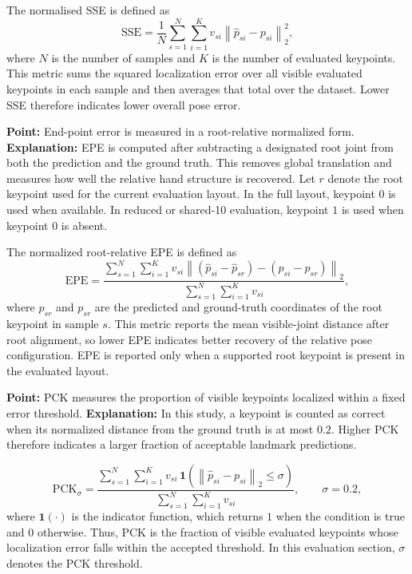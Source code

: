 \documentclass[10pt,letterpaper]{article}
\begin{document}
The normalised SSE is defined as
\[
\mathrm{SSE} =
\frac{1}{N}
\sum_{s=1}^{N}
\sum_{i=1}^{K}
v_{si}\left\|
\hat{p}_{si} - p_{si}
\right\|_2^2,
\]
where \(N\) is the number of samples and \(K\) is the number of evaluated keypoints. This metric sums the squared localization error over all visible evaluated keypoints in each sample and then averages that total over the dataset. Lower SSE therefore indicates lower overall pose error.

\medskip
\noindent\textbf{Point:} End-point error is measured in a root-relative normalized form.  
\textbf{Explanation:} EPE is computed after subtracting a designated root joint from both the prediction and the ground truth. This removes global translation and measures how well the relative hand structure is recovered. Let \(r\) denote the root keypoint used for the current evaluation layout. In the full layout, keypoint \(0\) is used when available. In reduced or shared-10 evaluation, keypoint \(1\) is used when keypoint \(0\) is absent.

The normalized root-relative EPE is defined as
\[
\mathrm{EPE} =
\frac{
\sum_{s=1}^{N}
\sum_{i=1}^{K}
v_{si}
\left\|
(\hat{p}_{si} - \hat{p}_{sr}) - (p_{si} - p_{sr})
\right\|_2
}{
\sum_{s=1}^{N}
\sum_{i=1}^{K}
v_{si}
},
\]
where \(\hat{p}_{sr}\) and \(p_{sr}\) are the predicted and ground-truth coordinates of the root keypoint in sample \(s\). This metric reports the mean visible-joint distance after root alignment, so lower EPE indicates better recovery of the relative pose configuration. EPE is reported only when a supported root keypoint is present in the evaluated layout.

\medskip
\noindent\textbf{Point:} PCK measures the proportion of visible keypoints localized within a fixed error threshold.  
\textbf{Explanation:} In this study, a keypoint is counted as correct when its normalized distance from the ground truth is at most \(0.2\). Higher PCK therefore indicates a larger fraction of acceptable landmark predictions.

\[
\mathrm{PCK}_{\sigma} =
\frac{
\sum_{s=1}^{N}
\sum_{i=1}^{K}
v_{si}\,\mathbf{1}
\left(
\left\|
\hat{p}_{si} - p_{si}
\right\|_2 \le \sigma
\right)
}{
\sum_{s=1}^{N}
\sum_{i=1}^{K}
v_{si}
},
\qquad \sigma = 0.2,
\]
where \(\mathbf{1}(\cdot)\) is the indicator function, which returns \(1\) when the condition is true and \(0\) otherwise. Thus, PCK is the fraction of visible evaluated keypoints whose localization error falls within the accepted threshold. In this evaluation section, \(\sigma\) denotes the PCK threshold.
\end{document}
